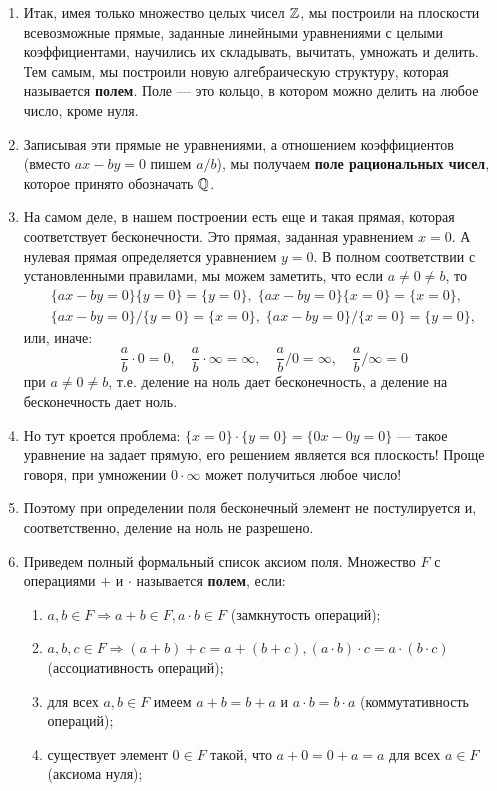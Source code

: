 \begin{enumerate}
\item Итак, имея только множество целых чисел $\mathbb Z$, мы построили на плоскости всевозможные прямые, заданные линейными уравнениями с целыми коэффициентами, научились их складывать, вычитать, умножать и делить. Тем самым, мы построили новую алгебраическую структуру, которая называется \textbf{полем}. Поле --- это кольцо, в котором можно делить на любое число, кроме нуля.
\item Записывая эти прямые не уравнениями, а отношением коэффициентов (вместо $ax-by=0$ пишем $a/b$), мы получаем \textbf{поле рациональных чисел}, которое принято обозначать $\mathbb Q$.
\item На самом деле, в нашем построении есть еще и такая прямая, которая соответствует бесконечности. Это прямая, заданная уравнением $x=0$. А нулевая прямая определяется уравнением $y=0$. В полном соответствии с установленными правилами, мы можем заметить, что если $a\ne 0 \ne b$, то
\begin{gather*}
\{ax-by=0\}\{y=0\}=\{y=0\},\;\{ax-by=0\}\{x=0\}=\{x=0\},\\ 
\{ax-by=0\}/\{y=0\}=\{x=0\},\;\{ax-by=0\}/\{x=0\}=\{y=0\},
\end{gather*}
или, иначе:
$$
\frac{a}{b}\cdot 0 = 0,\quad\frac{a}{b}\cdot\infty = \infty,\quad
\frac{a}{b}/ 0 = \infty,\quad\frac{a}{b}/\infty = 0
$$
при $a\ne 0\ne b$,
т.е. деление на ноль дает бесконечность, а деление на бесконечность дает ноль.
\item Но тут кроется проблема: $\{x=0\}\cdot\{y=0\}=\{0x-0y=0\}$ --- такое уравнение на задает прямую, его решением является вся плоскость! Проще говоря, при умножении $0\cdot\infty$ может получиться любое число!
\item Поэтому при определении поля бесконечный элемент не постулируется и, соответственно, деление на ноль не разрешено.
\item Приведем полный формальный список аксиом поля. Множество $F$ с операциями $+$ и $\cdot$ называется \textbf{полем}, если:
\begin{enumerate}[{\bf Field}1]
\item $a,b\in F\Rightarrow a+b\in F, a\cdot b\in F$ (замкнутость операций);
\item $a,b,c\in F\Rightarrow (a+b)+c=a+(b+c), (a\cdot b)\cdot c = a\cdot (b\cdot c)$ (ассоциативность операций);
\item для всех $a,b\in F$ имеем $a+b=b+a$ и $a\cdot b=b\cdot a$ (коммутативность операций);
\item существует элемент $0\in F$ такой, что $a+0=0+a=a$ для всех $a\in F$ (аксиома нуля);

\end{enumerate}
\end{enumerate}
